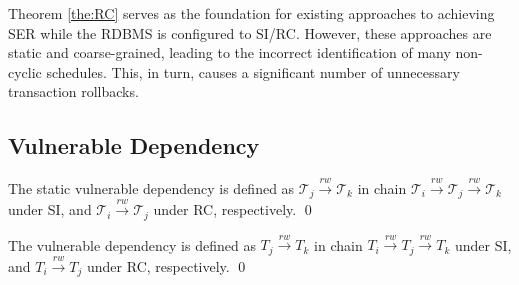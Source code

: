 Theorem \ref{the:RC} serves as the foundation for existing approaches to achieving SER while the RDBMS is configured to SI/RC. However, these approaches are static and coarse-grained, leading to the incorrect identification of many non-cyclic schedules. This, in turn, causes a significant number of unnecessary transaction rollbacks.


\subsection{Vulnerable Dependency}
\begin{definition}
    \label{def:static_vul}
    The static vulnerable dependency is defined as $\mathcal{T}_j \xrightarrow{rw} \mathcal{T}_k$ in chain $\mathcal{T}_i \xrightarrow{rw} \boxed{\mathcal{T}_j \xrightarrow{rw} \mathcal{T}_k}$ under SI, and $\boxed{\mathcal{T}_i \xrightarrow{rw} \mathcal{T}_j}$ under RC, respectively.  
    \qed
\end{definition}

\begin{definition}
    \label{def:vul}
    The vulnerable dependency is defined as $T_j \xrightarrow{rw} T_k$ in chain $T_i \xrightarrow{rw} \boxed{T_j \xrightarrow{rw} T_k}$ under SI, and $\boxed{T_i \xrightarrow{rw} T_j}$ under RC, respectively.
    \qed
\end{definition}

